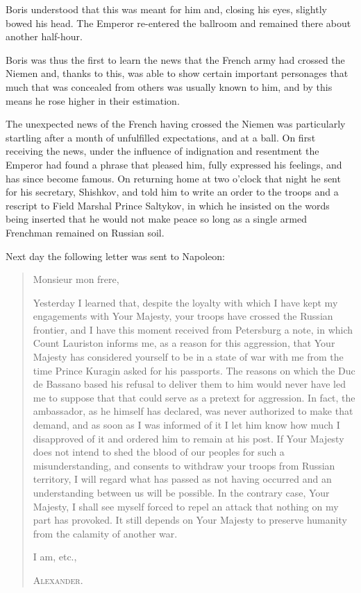 Boris understood that this was meant for him and, closing his
eyes, slightly bowed his head. The Emperor re-entered the
ballroom and remained there about another half-hour.

Boris was thus the first to learn the news that the French army
had crossed the Niemen and, thanks to this, was able to show
certain important personages that much that was concealed from
others was usually known to him, and by this means he rose higher
in their estimation.

The unexpected news of the French having crossed the Niemen was
particularly startling after a month of unfulfilled expectations,
and at a ball. On first receiving the news, under the influence
of indignation and resentment the Emperor had found a phrase that
pleased him, fully expressed his feelings, and has since become
famous. On returning home at two o'clock that night he sent for
his secretary, Shishkov, and told him to write an order to the
troops and a rescript to Field Marshal Prince Saltykov, in which
he insisted on the words being inserted that he would not make
peace so long as a single armed Frenchman remained on Russian
soil.

Next day the following letter was sent to Napoleon:
\begin{quote} \calli
  Monsieur mon frere,

  Yesterday I learned that, despite the loyalty with which I have
  kept my engagements with Your Majesty, your troops have crossed
  the Russian frontier, and I have this moment received from
  Petersburg a note, in which Count Lauriston informs me, as a
  reason for this aggression, that Your Majesty has considered
  yourself to be in a state of war with me from the time Prince
  Kuragin asked for his passports. The reasons on which the Duc
  de Bassano based his refusal to deliver them to him would never
  have led me to suppose that that could serve as a pretext for
  aggression. In fact, the ambassador, as he himself has
  declared, was never authorized to make that demand, and as soon
  as I was informed of it I let him know how much I disapproved
  of it and ordered him to remain at his post. If Your Majesty
  does not intend to shed the blood of our peoples for such a
  misunderstanding, and consents to withdraw your troops from
  Russian territory, I will regard what has passed as not having
  occurred and an understanding between us will be possible. In
  the contrary case, Your Majesty, I shall see myself forced to
  repel an attack that nothing on my part has provoked. It still
  depends on Your Majesty to preserve humanity from the calamity
  of another war. 

  I am, etc.,

  \textsc{Alexander.}
\end{quote}

